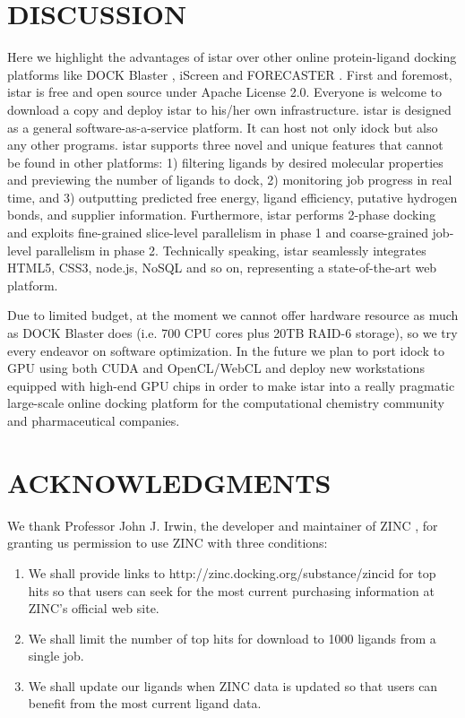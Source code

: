 \documentclass[12pt]{article}
\begin{document}
\section*{\sffamily \Large DISCUSSION}

Here we highlight the advantages of istar over other online protein-ligand docking platforms like DOCK Blaster \citep{557}, iScreen \citep{899} and FORECASTER \citep{1012}. First and foremost, istar is free and open source under Apache License 2.0. Everyone is welcome to download a copy and deploy istar to his/her own infrastructure. istar is designed as a general software-as-a-service platform. It can host not only idock but also any other programs. istar supports three novel and unique features that cannot be found in other platforms: 1) filtering ligands by desired molecular properties and previewing the number of ligands to dock, 2) monitoring job progress in real time, and 3) outputting predicted free energy, ligand efficiency, putative hydrogen bonds, and supplier information. Furthermore, istar performs 2-phase docking and exploits fine-grained slice-level parallelism in phase 1 and coarse-grained job-level parallelism in phase 2. Technically speaking, istar seamlessly integrates HTML5, CSS3, node.js, NoSQL and so on, representing a state-of-the-art web platform.

Due to limited budget, at the moment we cannot offer hardware resource as much as DOCK Blaster does (i.e. 700 CPU cores plus 20TB RAID-6 storage), so we try every endeavor on software optimization. In the future we plan to port idock to GPU using both CUDA and OpenCL/WebCL and deploy new workstations equipped with high-end GPU chips in order to make istar into a really pragmatic large-scale online docking platform for the computational chemistry community and pharmaceutical companies.

\section*{\sffamily \large ACKNOWLEDGMENTS}

We thank Professor John J. Irwin, the developer and maintainer of ZINC \citep{532,1178}, for granting us permission to use ZINC with three conditions:
\begin{enumerate}
\item We shall provide links to http://zinc.docking.org/substance/zincid for top hits so that users can seek for the most current purchasing information at ZINC's official web site.
\item We shall limit the number of top hits for download to 1000 ligands from a single job.
\item We shall update our ligands when ZINC data is updated so that users can benefit from the most current ligand data.
\end{enumerate}
\end{document}
